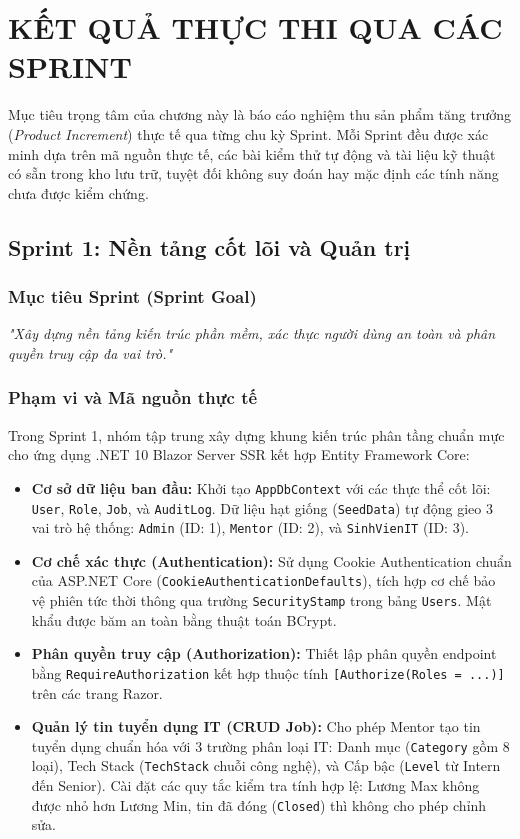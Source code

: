 \chapter{KẾT QUẢ THỰC THI QUA CÁC SPRINT}
\label{chap:ket-qua-sprint}

Mục tiêu trọng tâm của chương này là báo cáo nghiệm thu sản phẩm tăng trưởng (\textit{Product Increment}) thực tế qua từng chu kỳ Sprint. Mỗi Sprint đều được xác minh dựa trên mã nguồn thực tế, các bài kiểm thử tự động và tài liệu kỹ thuật có sẵn trong kho lưu trữ, tuyệt đối không suy đoán hay mặc định các tính năng chưa được kiểm chứng.

\section{Sprint 1: Nền tảng cốt lõi và Quản trị}
\label{sec:sprint-1}

\subsection{Mục tiêu Sprint (Sprint Goal)}
\textit{"Xây dựng nền tảng kiến trúc phần mềm, xác thực người dùng an toàn và phân quyền truy cập đa vai trò."}

\subsection{Phạm vi và Mã nguồn thực tế}
Trong Sprint 1, nhóm tập trung xây dựng khung kiến trúc phân tầng chuẩn mực cho ứng dụng .NET 10 Blazor Server SSR kết hợp Entity Framework Core:
\begin{itemize}
    \item \textbf{Cơ sở dữ liệu ban đầu:} Khởi tạo \texttt{AppDbContext} với các thực thể cốt lõi: \texttt{User}, \texttt{Role}, \texttt{Job}, và \texttt{AuditLog}. Dữ liệu hạt giống (\texttt{SeedData}) tự động gieo 3 vai trò hệ thống: \texttt{Admin} (ID: 1), \texttt{Mentor} (ID: 2), và \texttt{SinhVienIT} (ID: 3).
    \item \textbf{Cơ chế xác thực (Authentication):} Sử dụng Cookie Authentication chuẩn của ASP.NET Core (\texttt{CookieAuthenticationDefaults}), tích hợp cơ chế bảo vệ phiên tức thời thông qua trường \texttt{SecurityStamp} trong bảng \texttt{Users}. Mật khẩu được băm an toàn bằng thuật toán BCrypt.
    \item \textbf{Phân quyền truy cập (Authorization):} Thiết lập phân quyền endpoint bằng \texttt{RequireAuthorization} kết hợp thuộc tính \texttt{[Authorize(Roles = ...)]} trên các trang Razor.
    \item \textbf{Quản lý tin tuyển dụng IT (CRUD Job):} Cho phép Mentor tạo tin tuyển dụng chuẩn hóa với 3 trường phân loại IT: Danh mục (\texttt{Category} gồm 8 loại), Tech Stack (\texttt{TechStack} chuỗi công nghệ), và Cấp bậc (\texttt{Level} từ Intern đến Senior). Cài đặt các quy tắc kiểm tra tính hợp lệ: Lương Max không được nhỏ hơn Lương Min, tin đã đóng (\texttt{Closed}) thì không cho phép chỉnh sửa.
\end{itemize}

